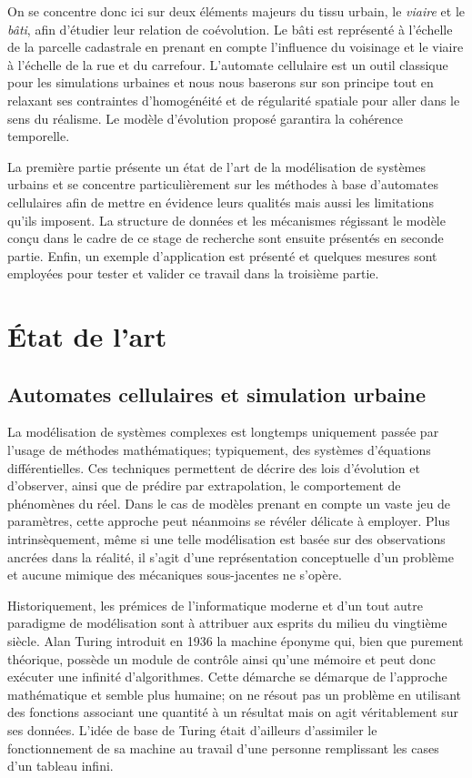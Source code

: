 \documentclass[10pt]{article}
\begin{document}
On se concentre donc ici sur deux éléments majeurs du tissu urbain, le
\textit{viaire} et le \textit{bâti}, afin d'étudier leur relation de
coévolution. Le bâti est représenté à l'échelle de la parcelle
cadastrale en prenant en compte l'influence du voisinage et le viaire
à l'échelle de la rue et du carrefour. L'automate cellulaire est un
outil classique pour les simulations urbaines et nous nous baserons
sur son principe tout en relaxant ses contraintes d'homogénéité et de
régularité spatiale pour aller dans le sens du réalisme. Le modèle
d'évolution proposé garantira la cohérence temporelle.

La première partie présente un état de l'art de la modélisation de
systèmes urbains et se concentre particulièrement sur les méthodes à
base d'automates cellulaires afin de mettre en évidence leurs qualités
mais aussi les limitations qu'ils imposent. La structure de données et
les mécanismes régissant le modèle conçu dans le cadre de ce stage de
recherche sont ensuite présentés en seconde partie. Enfin, un exemple
d'application est présenté et quelques mesures sont employées pour
tester et valider ce travail dans la troisième partie.

\section{\'Etat de l'art}

\subsection{Automates cellulaires et simulation urbaine}

La modélisation de systèmes complexes est longtemps uniquement passée
par l'usage de méthodes mathématiques; typiquement, des systèmes
d'équations différentielles. Ces techniques permettent de décrire des
lois d'évolution et d'observer, ainsi que de prédire par
extrapolation, le comportement de phénomènes du réel. Dans le cas de
modèles prenant en compte un vaste jeu de paramètres, cette approche
peut néanmoins se révéler délicate à employer. Plus intrinsèquement,
même si une telle modélisation est basée sur des observations ancrées
dans la réalité, il s'agit d'une représentation conceptuelle d'un
problème et aucune mimique des mécaniques sous-jacentes ne s'opère.

Historiquement, les prémices de l'informatique moderne et d'un tout
autre paradigme de modélisation sont à attribuer aux esprits du milieu
du vingtième siècle. Alan Turing introduit en 1936 la machine éponyme
qui, bien que purement théorique, possède un module de contrôle ainsi
qu'une mémoire et peut donc exécuter une infinité d'algorithmes. Cette
démarche se démarque de l'approche mathématique et semble plus
humaine; on ne résout pas un problème en utilisant des fonctions
associant une quantité à un résultat mais on agit véritablement sur
ses données. L'idée de base de Turing était d'ailleurs d'assimiler le
fonctionnement de sa machine au travail d'une personne remplissant les
cases d'un tableau infini.
\end{document}
